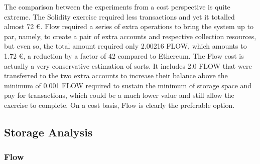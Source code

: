 \documentclass[../NFTComp_IEEE.tex]{subfiles}
\begin{document}
\par
The comparison between the experiments from a cost perspective is quite extreme. The Solidity exercise required less transactions and yet it totalled almost 72 €. Flow required a series of extra operations to bring the system up to par, namely, to create a pair of extra accounts and respective collection resources, but even so, the total amount required only 2.00216 FLOW, which amounts to 1.72 €, a reduction by a factor of 42 compared to Ethereum. The Flow cost is actually a very conservative estimation of sorts. It includes 2.0 FLOW that were transferred to the two extra accounts to increase their balance above the minimum of 0.001 FLOW required to sustain the minimum of storage space and pay for transactions, which could be a much lower value and still allow the exercise to complete. On a cost basis, Flow is clearly the preferable option.

\subsection{Storage Analysis}

\subsubsection{Flow}
\end{document}
